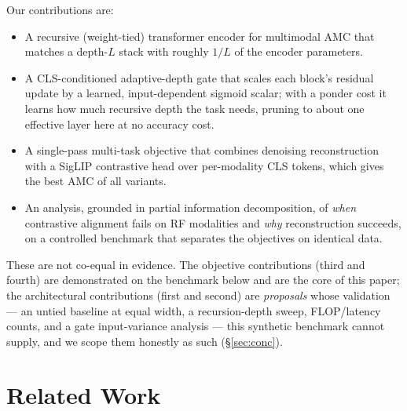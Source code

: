 \documentclass[conference]{IEEEtran}
\begin{document}
Our contributions are:
\begin{itemize}
\item A recursive (weight-tied) transformer encoder for multimodal AMC that
matches a depth-$L$ stack with roughly $1/L$ of the encoder parameters.
\item A CLS-conditioned adaptive-depth gate that scales each block's residual
update by a learned, input-dependent sigmoid scalar; with a ponder cost it learns
how much recursive depth the task needs, pruning to about one effective layer here
at no accuracy cost.
\item A single-pass multi-task objective that combines denoising reconstruction with
a SigLIP contrastive head over per-modality CLS tokens, which gives the best AMC
of all variants.
\item An analysis, grounded in partial information decomposition, of \emph{when}
contrastive alignment fails on RF modalities and \emph{why} reconstruction
succeeds, on a controlled benchmark that separates the objectives on identical data.
\end{itemize}
These are not co-equal in evidence. The objective contributions (third and fourth)
are demonstrated on the benchmark below and are the core of this paper; the
architectural contributions (first and second) are \emph{proposals} whose validation
--- an untied baseline at equal width, a recursion-depth sweep, FLOP/latency counts,
and a gate input-variance analysis --- this synthetic benchmark cannot supply, and we
scope them honestly as such (\S\ref{sec:conc}).

\section{Related Work}
\end{document}
